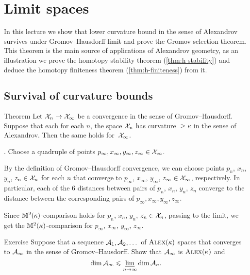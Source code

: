 
\chapter{Limit spaces}\label{chap:lim}\label{chap:stability}

In this lecture we show that lower curvature bound in the sense of Alexandrov survives under Gromov--Hausdorff limit and prove the Gromov selection theorem.
This theorem is the main source of applications of Alexandrov geometry,
as an illustration we prove the homotopy stability theorem (\ref{thm:h-stability}) and deduce the homotopy finiteness theorem (\ref{thm:h-finiteness}) from it.


\section{Survival of curvature bounds}

\begin{thm}{Theorem}\label{thm:CBB-closed}
Let $\mathcal{X}_n\to \mathcal{X}_\infty$ be a convergence in the sense of Gromov--Hausdorff.
Suppose that each for each $n$, the space $\mathcal{X}_n$ has curvature $\ge\kappa$ in the sense of Alexandrov.
Then the same holds for~$\mathcal{X}_\infty$.
\end{thm}

.
Choose a quadruple of points $p_\infty, x_\infty,y_\infty,z_\infty\in \mathcal{X}_\infty$.

By the definition of Gromov--Hausdorff convergence, we can choose points $p_n$,  $x_n$, $y_n$, $z_n\in \mathcal{X}_n$ for each $n$
that converge to $p_\infty$, $x_\infty$, $y_\infty$, $z_\infty\in \mathcal{X}_\infty$, respectively.
In particular, each of the 6 distances between pairs of $p_n$, $x_n$, $y_n$, $z_n$ converge to the distance between the corresponding pairs of $p_\infty, x_\infty,y_\infty,z_\infty$.

Since $\mathbb{M}^2(\kappa)$-comparison holds for $p_n$, $x_n$, $y_n$, $z_n\in \mathcal{X}_n$,
passing to the limit, we get the $\mathbb{M}^2(\kappa)$-comparison for $p_\infty$,  $x_\infty$, $y_\infty$, $z_\infty$.
\qeds

\begin{thm}{Exercise}\label{ex:dim-lim}
Suppose that a sequence $\mathcal{A}_1,\mathcal{A}_2,\dots$ of $\textsc{Alex}(\kappa)$ spaces that converges to $\mathcal{A}_\infty$ in the sense of Gromov--Hausdorff.
Show that $\mathcal{A}_\infty$ is $\textsc{Alex}(\kappa)$ and
\[\operatorname{\rm dim}\nolimits \mathcal{A}_\infty\leqslant \varliminf_{n\to\infty} \operatorname{\rm dim}\nolimits \mathcal{A}_n.\]
\end{thm}


